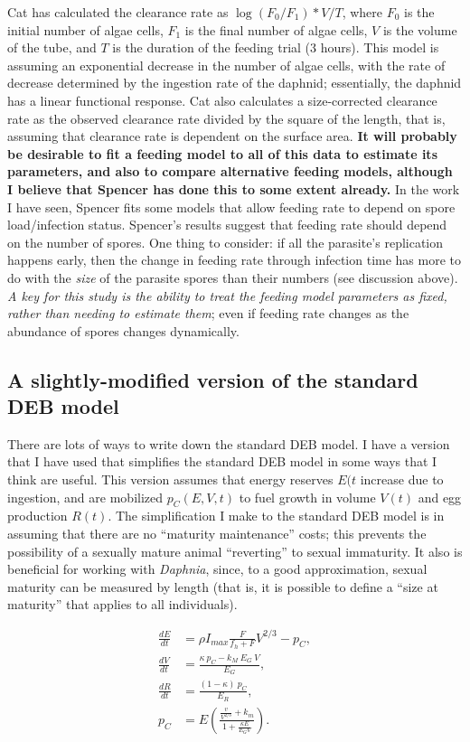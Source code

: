 \documentclass[11pt,reqno,final,pdftex]{amsart}\usepackage[]{graphicx}\usepackage[]{color}
\theoremstyle{plain}
\numberwithin{equation}{part}
\begin{document}
Cat has calculated the clearance rate as $\log(F_0/F_1)*V/T$, where $F_0$ is the initial number of algae cells, $F_1$ is the final number of algae cells, $V$ is the volume of the tube, and $T$ is the duration of the feeding trial (3 hours).
This model is assuming an exponential decrease in the number of algae cells, with the rate of decrease determined by the ingestion rate of the daphnid; essentially, the daphnid has a linear functional response.
Cat also calculates a size-corrected clearance rate as the observed clearance rate divided by the square of the length, that is, assuming that clearance rate is dependent on the surface area.
\textbf{It will probably be desirable to fit a feeding model to all of this data to estimate its parameters, and also to compare alternative feeding models, although I believe that Spencer has done this to some extent already.}
In the work I have seen, Spencer fits some models that allow feeding rate to depend on spore load/infection status.
Spencer's results suggest that feeding rate should depend on the number of spores.
One thing to consider: if all the parasite's replication happens early, then the change in feeding rate through infection time has more to do with the \emph{size} of the parasite spores than their numbers (see discussion above).
\emph{A key for this study is the ability to treat the feeding model parameters as fixed, rather than needing to estimate them}; even if feeding rate changes as the abundance of spores changes dynamically.

\subsection*{A slightly-modified version of the standard DEB model}
There are lots of ways to write down the standard DEB model.
I have a version that I have used that simplifies the standard DEB model in some ways that I think are useful.
This version assumes that energy reserves $E(t$ increase due to ingestion, and are mobilized $p_C(E,V,t)$ to fuel growth in volume $V(t)$ and egg production $R(t)$.
The simplification I make to the standard DEB model is in assuming that there are no ``maturity maintenance'' costs; this prevents the possibility of a sexually mature animal ``reverting'' to sexual immaturity.
It also is beneficial for working with \emph{Daphnia}, since, to a good approximation, sexual maturity can be measured by length (that is, it is possible to define a ``size at maturity'' that applies to all individuals).

\begin{align}
\frac{dE}{dt} &= \rho I_{max} \frac{F}{f_h+F} V^{2/3} - p_C, \\
\frac{dV}{dt} &= \frac{\kappa~p_C - k_M~E_G~V}{E_G}, \\
\frac{dR}{dt} &= \frac{(1-\kappa)~p_C}{E_R}, \\
p_C &= E \left(\frac{\frac{v}{V^{2/3}} + k_m}{1+\frac{\kappa E}{E_G V}}\right).
\end{align}
\end{document}
